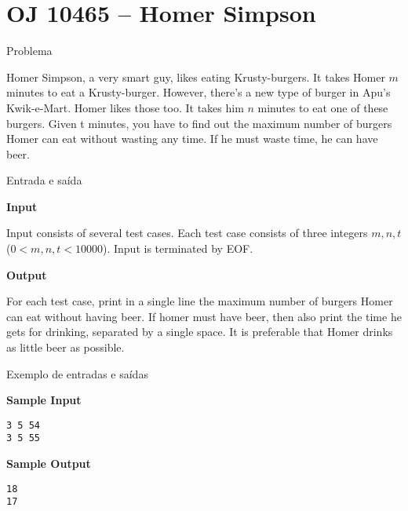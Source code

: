 \section{OJ 10465 -- Homer Simpson}

\begin{frame}[fragile]{Problema}

Homer Simpson, a very smart guy, likes eating Krusty-burgers. It takes Homer $m$ minutes to eat a
Krusty-burger. However, there’s a new type of burger in Apu’s Kwik-e-Mart. Homer likes those too.
It takes him $n$ minutes to eat one of these burgers. Given t minutes, you have to find out the
maximum number of burgers Homer can eat without wasting any time. If he must waste time, he can
have beer.

\end{frame}

\begin{frame}[fragile]{Entrada e saída}

\textbf{Input}

Input consists of several test cases. Each test case consists of three integers $m, n, t$ ($0 < m,
n, t < 10000$). Input is terminated by EOF.

\vspace{0.2in}

\textbf{Output}

For each test case, print in a single line the maximum number of burgers Homer can eat without
having beer. If homer must have beer, then also print the time he gets for drinking, separated by
a single space. It is preferable that Homer drinks as little beer as possible.

\end{frame}

\begin{frame}[fragile]{Exemplo de entradas e saídas}

\begin{minipage}[t]{0.45\textwidth}
\textbf{Sample Input}
\begin{verbatim}
3 5 54
3 5 55
\end{verbatim}
\end{minipage}
\begin{minipage}[t]{0.5\textwidth}
\textbf{Sample Output}
\begin{verbatim}
18
17
\end{verbatim}
\end{minipage}
\end{frame}

